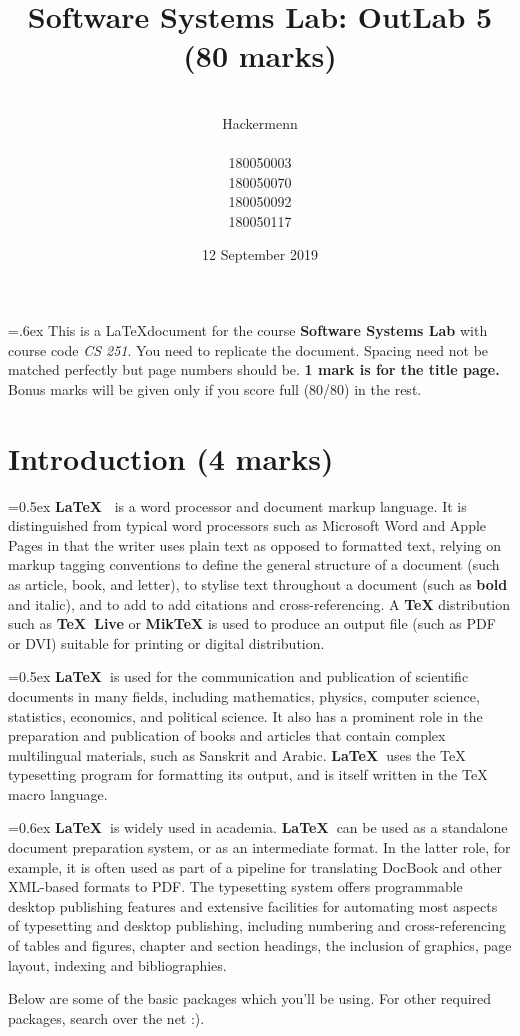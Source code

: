 \documentclass[12pt]{article}
\title{\vspace{5.2cm} \textbf{\Huge Software Systems Lab: OutLab 5 \\[1ex] \latex (80 marks)}}
\author{\\  \LARGE Hackermenn \\ \\  \large 180050003 \\  \large 180050070 \\ \large 180050092 \\ \large 180050117}
\date{ 12 September 2019}
\newcommand{\latex}{\LaTeX\ }
\newcommand{\tex}{\TeX\ }
\begin{document}
\maketitle
\thispagestyle{empty}
\clearpage
\setcounter{page}{1}

\tableofcontents

\pagebreak
{}\font=.6ex
This is a \LaTeX document for the course \textbf{Software Systems Lab} with course code \textit{CS 251}. You need to replicate the document. Spacing need not be matched perfectly but page numbers should be. \textbf {1 mark is for the title page.} Bonus marks will be given only if you score full (80/80) in the rest.

\section{Introduction (4 marks)}  
\setlength{\parindent}{1.5ex}
{}\font=0.5ex
\textbf{\latex} is a word processor and document markup language. It is distinguished from typical word processors such as Microsoft Word and Apple Pages in that the writer uses plain text as opposed to formatted text, relying on markup tagging conventions to define the general structure of a document (such as article, book, and letter), to stylise text throughout a document (such as \textbf{bold} and italic), and to add to add citations and cross-referencing. A \textbf{\TeX} distribution such as \textbf{\tex Live} or \textbf{MikTeX} is used to produce an output file (such as PDF or DVI) suitable for printing or digital distribution. 
\\ \par
{}\font=0.5ex
\textbf{\latex}is used for the communication and publication of scientific documents in many fields, including mathematics, physics, computer science, statistics, economics, and political science. It also has a prominent role in the preparation and publication of books and articles that contain complex multilingual materials, such as Sanskrit and Arabic. \textbf{\latex}uses the TeX typesetting program for formatting its output, and is itself written in the TeX macro language.  
\\ \par 
{}\font=0.6ex
\textbf{\latex}is widely used in academia. \textbf{\latex}can be used as a standalone document preparation system, or as an intermediate format. In the latter role, for example, it is often used as part of a pipeline for translating DocBook and other XML-based formats to PDF. The typesetting system offers programmable desktop publishing features and extensive facilities for automating most aspects of typesetting and desktop publishing, including numbering and cross-referencing of tables and figures, chapter and section headings, the inclusion of graphics, page layout, indexing and bibliographies.
\\ \par 
Below are some of the basic packages which you’ll be using. For other
required packages, search over the net :).  
\end{document}

